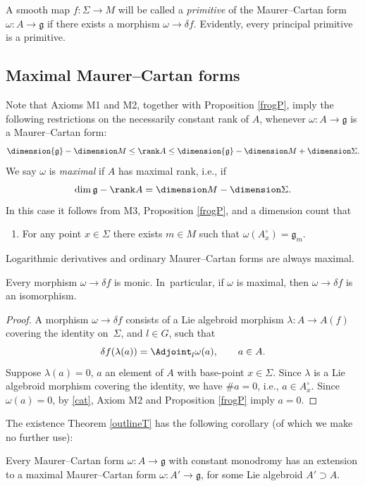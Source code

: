 A smooth map $f \colon \Sigma \rightarrow M$ will be called a {\it primitive} of the Maurer--Cartan form
$\omega \colon A \rightarrow {\mathfrak g} $ if there exists a
morphism $\omega \rightarrow \delta f$. Evidently, every principal
primitive is a primitive.

\subsection*{Maximal Maurer--Cartan forms}%

Note that Axioms M1 and M2, together with Proposition \ref{frogP},
imply the following restrictions on the necessarily constant rank of
$A$, whenever $\omega \colon A \rightarrow {\mathfrak g} $ is a
Maurer--Cartan form:
\begin{equation*}
\dimension {\mathfrak g} -\dimension M\le \rank A
\le \dimension {\mathfrak g} -\dimension M + \dimension \Sigma.
\end{equation*}
We say $\omega $ is {\it maximal} if $A$ has maximal
rank, i.e., if
\[
\dim {\mathfrak g}-\rank A = \dimension M - \dimension \Sigma.
\]
In
this case it follows from M3, Proposition \ref{frogP}, and a dimension
count that
\begin{enumerate}\itemsep=0pt
\item[M3$'$.] For any point $x \in \Sigma $ there exists $m \in M$
such that $\omega(A^\circ_x) = {\mathfrak g}_m$.
\end{enumerate} Logarithmic derivatives and ordinary Maurer--Cartan
forms are always maximal.
%
\begin{Lemma}%
 Every morphism $\omega \rightarrow \delta f$ is monic. In~particular, if $\omega $ is maximal, then
 $\omega \rightarrow \delta f$ is an isomorphism.
\end{Lemma}

\begin{proof} A morphism $\omega \rightarrow \delta f$ consists of a
Lie algebroid morphism $\lambda \colon A \rightarrow A(f)$ covering
the identity on~$\Sigma$, and $l \in G$, such that
 \begin{equation}
 \delta f (\lambda(a))=\Adjoint_l \omega(a), \qquad a \in A.\label{cat}
 \end{equation}
 Suppose $\lambda(a)=0$, $a$ an element of $A $ with
base-point $x \in \Sigma $. Since $\lambda$ is a Lie algebroid
morphism covering the identity, we have $\# a =0$, i.e., $a \in
A^\circ_x$. Since $\omega(a)=0$, by \eqref{cat}, Axiom M2 and
Proposition \ref{frogP} imply $a=0$.
\end{proof}
%
The existence Theorem \ref{outlineT} has the following corollary (of
which we make no further use):
\begin{Corollary}%
 Every Maurer--Cartan form
 $\omega \colon A \rightarrow {\mathfrak g} $ with constant monodromy
 has an extension to a maximal Maurer--Cartan form
 $\omega \colon A' \rightarrow {\mathfrak g} $, for some Lie
 algebroid $A' \supset A$.
\end{Corollary}

